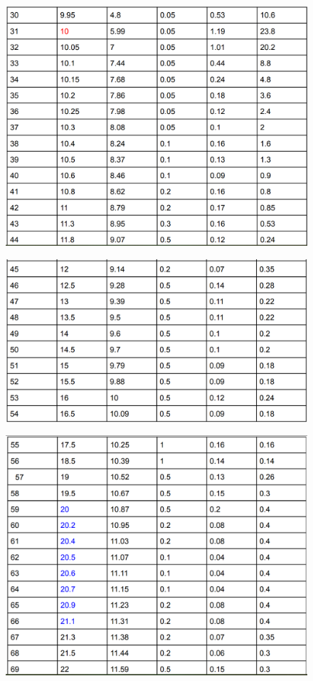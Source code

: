 \documentclass[12pt]{article}
\begin{document}
	\begin{figure}[H]
		\centering
		\includegraphics[scale=0.7]{table4}
	\end{figure}
	\begin{figure}[H]
		\centering
		\includegraphics[scale=0.7]{table5}
	\end{figure}
	\begin{figure}[H]
		\centering
		\includegraphics[scale=0.7]{table6}
	\end{figure}
\end{document}
